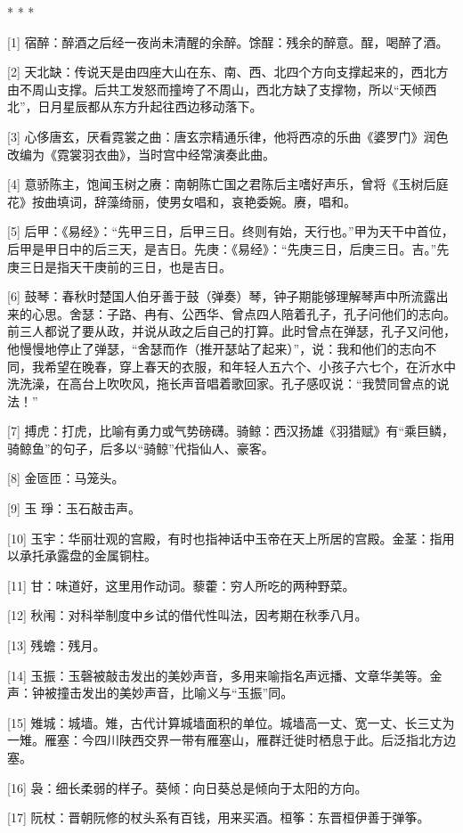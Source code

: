 \documentclass[12pt,UTF8]{ctexbook}
\begin{document}
* * *



[1] 宿醉：醉酒之后经一夜尚未清醒的余醉。馀酲：残余的醉意。酲，喝醉了酒。

[2] 天北缺：传说天是由四座大山在东、南、西、北四个方向支撑起来的，西北方由不周山支撑。后共工发怒而撞垮了不周山，西北方缺了支撑物，所以“天倾西北”，日月星辰都从东方升起往西边移动落下。

[3] 心侈唐玄，厌看霓裳之曲：唐玄宗精通乐律，他将西凉的乐曲《婆罗门》润色改编为《霓裳羽衣曲》，当时宫中经常演奏此曲。

[4] 意骄陈主，饱闻玉树之赓：南朝陈亡国之君陈后主嗜好声乐，曾将《玉树后庭花》按曲填词，辞藻绮丽，使男女唱和，哀艳委婉。赓，唱和。

[5] 后甲：《易经》：“先甲三日，后甲三日。终则有始，天行也。”甲为天干中首位，后甲是甲日中的后三天，是吉日。先庚：《易经》：“先庚三日，后庚三日。吉。”先庚三日是指天干庚前的三日，也是吉日。

[6] 鼓琴：春秋时楚国人伯牙善于鼓（弹奏）琴，钟子期能够理解琴声中所流露出来的心思。舍瑟：子路、冉有、公西华、曾点四人陪着孔子，孔子问他们的志向。前三人都说了要从政，并说从政之后自己的打算。此时曾点在弹瑟，孔子又问他，他慢慢地停止了弹瑟，“舍瑟而作（推开瑟站了起来）”，说：我和他们的志向不同，我希望在晚春，穿上春天的衣服，和年轻人五六个、小孩子六七个，在沂水中洗洗澡，在高台上吹吹风，拖长声音唱着歌回家。孔子感叹说：“我赞同曾点的说法！”

[7] 搏虎：打虎，比喻有勇力或气势磅礴。骑鲸：西汉扬雄《羽猎赋》有“乘巨鳞，骑鲸鱼”的句子，后多以“骑鲸”代指仙人、豪客。

[8] 金匼匝：马笼头。

[9] 玉 琤：玉石敲击声。

[10] 玉宇：华丽壮观的宫殿，有时也指神话中玉帝在天上所居的宫殿。金茎：指用以承托承露盘的金属铜柱。

[11] 甘：味道好，这里用作动词。藜藿：穷人所吃的两种野菜。

[12] 秋闱：对科举制度中乡试的借代性叫法，因考期在秋季八月。

[13] 残蟾：残月。

[14] 玉振：玉磬被敲击发出的美妙声音，多用来喻指名声远播、文章华美等。金声：钟被撞击发出的美妙声音，比喻义与“玉振”同。

[15] 雉城：城墙。雉，古代计算城墙面积的单位。城墙高一丈、宽一丈、长三丈为一雉。雁塞：今四川陕西交界一带有雁塞山，雁群迁徙时栖息于此。后泛指北方边塞。

[16] 袅：细长柔弱的样子。葵倾：向日葵总是倾向于太阳的方向。

[17] 阮杖：晋朝阮修的杖头系有百钱，用来买酒。桓筝：东晋桓伊善于弹筝。
\end{document}
